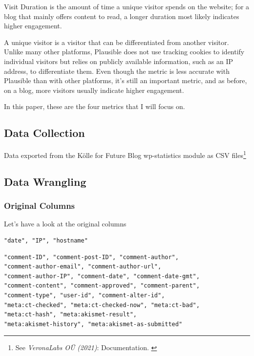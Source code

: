 Visit Duration is the amount of time a unique visitor spends on the website; for a blog that mainly offers content to read, a longer duration most likely indicates higher engagement.

A unique visitor is a visitor that can be differentiated from another visitor. Unlike many other platforms, Plausible does not use tracking cookies to identify individual visitors but relies on publicly available information, such as an IP address, to differentiate them. Even though the metric is less accurate with Plausible than with other platforms, it's still an important metric, and as before, on a blog, more visitors usually indicate higher engagement.

In this paper, these are the four metrics that I will focus on.

\subsection{Data Collection}

Data exported from the Kölle for Future Blog wp-statistics module as CSV files\footnote{See \textit{VeronaLabs OÜ (2021)}: Documentation. \cite{wpStatistics}}

\subsection{Data Wrangling}

\subsubsection{Original Columns}

Let's have a look at the original columns

\begin{lstlisting}[caption=wp-admin, frame=single, basicstyle=\ttfamily]
"date", "IP", "hostname"
\end{lstlisting}

\begin{lstlisting}[caption=wp-comments, frame=single, basicstyle=\ttfamily]
"comment-ID", "comment-post-ID", "comment-author", 
"comment-author-email", "comment-author-url", 
"comment-author-IP", "comment-date", "comment-date-gmt", 
"comment-content", "comment-approved", "comment-parent", 
"comment-type", "user-id", "comment-alter-id", 
"meta:ct-checked", "meta:ct-checked-now", "meta:ct-bad", 
"meta:ct-hash", "meta:akismet-result", 
"meta:akismet-history", "meta:akismet-as-submitted"
\end{lstlisting}

